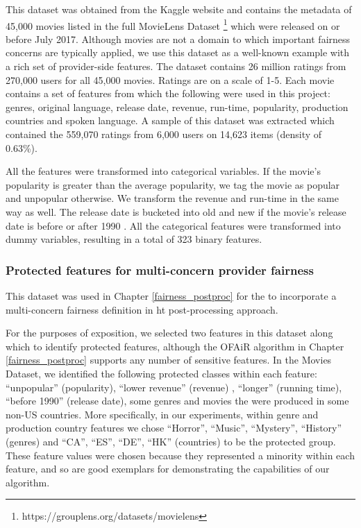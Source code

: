     This dataset was obtained from the Kaggle website and contains the metadata of 45,000 movies listed in the full MovieLens Dataset \footnote{https://grouplens.org/datasets/movielens} which were released on or before July 2017. Although movies are not a domain to which important fairness concerns are typically applied, we use this dataset as a well-known example with a rich set of provider-side features. The dataset contains 26 million ratings from 270,000 users for all 45,000 movies. Ratings are on a scale of 1-5. Each movie contains a set of features from which the following were used in this project: genres, original language, release date, revenue, run-time, popularity, production countries and spoken language. A sample of this dataset was extracted which contained the 559,070 ratings from 6,000 users on 14,623 items (density of 0.63\%).

    All the features were transformed into categorical variables. If the movie's popularity is greater than the average popularity, we tag the movie as popular and unpopular otherwise. We transform the revenue and run-time in the same way as well. The release date is bucketed into old and new if the movie's release date is before or after 1990 \cite{kamishima2016model}. All the categorical features were transformed into dummy variables, resulting in a total of 323 binary features.

        \subsubsection{Protected features for multi-concern provider fairness}
        This dataset was used in Chapter \ref{fairness_postproc} for the to incorporate a multi-concern fairness definition in ht post-processing approach.
        
        For the purposes of exposition, we selected two features in this dataset along which to identify protected features, although the OFAiR algorithm in Chapter \ref{fairness_postproc} supports any number of sensitive features. In the Movies Dataset, we identified the following protected classes within each feature: ``unpopular'' (popularity), ``lower revenue'' (revenue) , ``longer'' (running time), ``before 1990'' (release date), some genres and movies the were produced in some non-US countries. More specifically, in our experiments, within genre and production country features we chose ``Horror'', ``Music'', ``Mystery'', ``History'' (genres) and ``CA'', ``ES'', ``DE'', ``HK'' (countries) to be the protected group. These feature values were chosen because they represented a minority within each feature, and so are good exemplars for demonstrating the capabilities of our algorithm.



